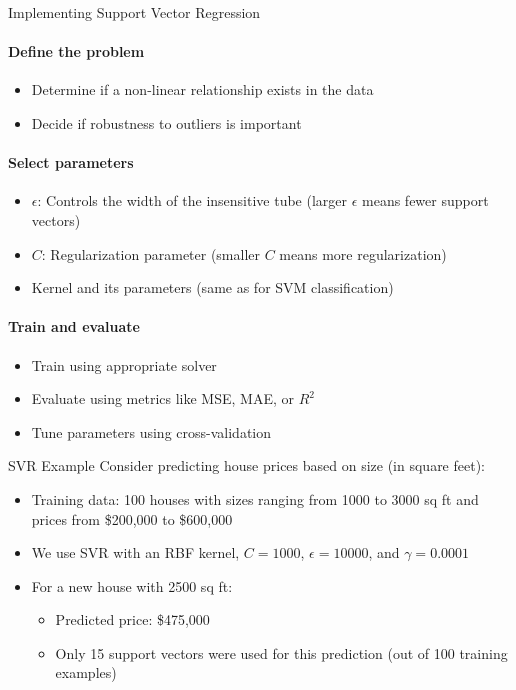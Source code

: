 \begin{KR}{Implementing Support Vector Regression}\\
\paragraph{Define the problem}
\begin{itemize}
    \item Determine if a non-linear relationship exists in the data
    \item Decide if robustness to outliers is important
\end{itemize}

\paragraph{Select parameters}
\begin{itemize}
    \item $\epsilon$: Controls the width of the insensitive tube (larger $\epsilon$ means fewer support vectors)
    \item $C$: Regularization parameter (smaller $C$ means more regularization)
    \item Kernel and its parameters (same as for SVM classification)
\end{itemize}

\paragraph{Train and evaluate}
\begin{itemize}
    \item Train using appropriate solver
    \item Evaluate using metrics like MSE, MAE, or $R^2$
    \item Tune parameters using cross-validation
\end{itemize}
\end{KR}

\begin{example}{SVR Example}
Consider predicting house prices based on size (in square feet):
\begin{itemize}
    \item Training data: 100 houses with sizes ranging from 1000 to 3000 sq ft and prices from \$200,000 to \$600,000
    \item We use SVR with an RBF kernel, $C=1000$, $\epsilon=10000$, and $\gamma=0.0001$
    \item For a new house with 2500 sq ft:
    \begin{itemize}
        \item Predicted price: \$475,000
        \item Only 15 support vectors were used for this prediction (out of 100 training examples)
    \end{itemize}
\end{itemize}
\end{example}